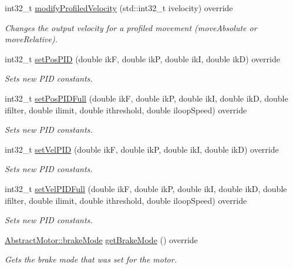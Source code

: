 \begin{DoxyCompactItemize}
int32\+\_\+t \mbox{\hyperlink{classokapi_1_1MockMotor_a0f933850a2584d908e0b0da297836f81}{modify\+Profiled\+Velocity}} (std\+::int32\+\_\+t ivelocity) override
\begin{DoxyCompactList}\small\item\em Changes the output velocity for a profiled movement (move\+Absolute or move\+Relative). \end{DoxyCompactList}\item 
int32\+\_\+t \mbox{\hyperlink{classokapi_1_1MockMotor_a4dd6aec2cd4039ffc0f9430adf6635f3}{set\+Pos\+P\+ID}} (double ikF, double ikP, double ikI, double ikD) override
\begin{DoxyCompactList}\small\item\em Sets new P\+ID constants. \end{DoxyCompactList}\item 
int32\+\_\+t \mbox{\hyperlink{classokapi_1_1MockMotor_afa5d3d292dcd7873287ac5efe0aa3fbb}{set\+Pos\+P\+I\+D\+Full}} (double ikF, double ikP, double ikI, double ikD, double ifilter, double ilimit, double ithreshold, double iloop\+Speed) override
\begin{DoxyCompactList}\small\item\em Sets new P\+ID constants. \end{DoxyCompactList}\item 
int32\+\_\+t \mbox{\hyperlink{classokapi_1_1MockMotor_a5b22622e342d38625dd0da8b488828e9}{set\+Vel\+P\+ID}} (double ikF, double ikP, double ikI, double ikD) override
\begin{DoxyCompactList}\small\item\em Sets new P\+ID constants. \end{DoxyCompactList}\item 
int32\+\_\+t \mbox{\hyperlink{classokapi_1_1MockMotor_a8665a2bdee39208dfa43aafac83f37f2}{set\+Vel\+P\+I\+D\+Full}} (double ikF, double ikP, double ikI, double ikD, double ifilter, double ilimit, double ithreshold, double iloop\+Speed) override
\begin{DoxyCompactList}\small\item\em Sets new P\+ID constants. \end{DoxyCompactList}\item 
\mbox{\hyperlink{classokapi_1_1AbstractMotor_a132e0485dbb59a60c3f934338d8fa601}{Abstract\+Motor\+::brake\+Mode}} \mbox{\hyperlink{classokapi_1_1MockMotor_a5c545e42aff91b29c48b81d64f625c9a}{get\+Brake\+Mode}} () override
\begin{DoxyCompactList}\small\item\em Gets the brake mode that was set for the motor. \end{DoxyCompactList}\item 

\end{DoxyCompactItemize}
